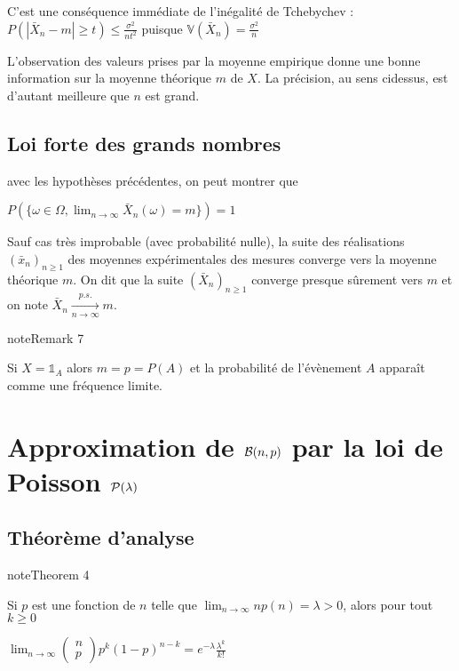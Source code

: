 \documentclass[letterpaper,10pt,english]{jupyterBook}
\begin{document}
\sphinxAtStartPar
C’est une conséquence immédiate de l’inégalité de Tchebychev : \(P(|\bar{X}_n-m|\geq t)\leq\frac{\sigma^2}{nt^2}\) puisque \(\mathbb{V}(\bar{X}_n)=\frac{\sigma^2}{n}\)

\sphinxAtStartPar
L’observation des valeurs prises par la moyenne empirique donne une bonne information sur la moyenne théorique \(m\) de \(X\). La précision, au sens ci\sphinxhyphen{}dessus, est d’autant meilleure que \(n\) est grand.


\subsection{Loi forte des grands nombres}
\label{\detokenize{elemstats:loi-forte-des-grands-nombres}}
\sphinxAtStartPar
avec les hypothèses précédentes, on peut montrer que

\sphinxAtStartPar
\(P(\{\omega\in\Omega, \displaystyle\lim_{n\rightarrow\infty} \bar{X}_n(\omega)=m\})=1\)

\sphinxAtStartPar
Sauf cas très improbable (avec probabilité nulle), la suite des réalisations \((\bar{x}_n)_{n\geq 1}\) des moyennes expérimentales des mesures converge vers la moyenne théorique \(m\). On dit que la suite \((\bar{X}_n)_{n\geq 1}\) converge presque sûrement vers \(m\) et on note \(\bar{X}_n\xrightarrow[n\rightarrow\infty]{p.s.} m\).
\label{elemstats:remark-7}
\begin{sphinxadmonition}{note}{Remark 7}



\sphinxAtStartPar
Si \(X=\mathbb{1}_A\) alors \(m=p=P(A)\) et la probabilité de l’évènement \(A\) apparaît comme une fréquence limite.
\end{sphinxadmonition}


\section{Approximation de \protect\(\mathcal{B}(n,p)\protect\) par la loi de Poisson \protect\(\mathcal P(\lambda)\protect\)}
\label{\detokenize{elemstats:approximation-de-mathcal-b-n-p-par-la-loi-de-poisson-mathcal-p-lambda}}

\subsection{Théorème d’analyse}
\label{\detokenize{elemstats:theoreme-d-analyse}}\label{elemstats:theorem-8}
\begin{sphinxadmonition}{note}{Theorem 4}



\sphinxAtStartPar
Si \(p\) est une fonction de \(n\) telle que \(\displaystyle\lim_{n\rightarrow\infty}np(n)=\lambda>0\), alors pour tout \(k\geq 0\)

\sphinxAtStartPar
\(\displaystyle\lim_{n\rightarrow\infty}\begin{pmatrix}n\\p\end{pmatrix} p^k(1-p)^{n-k} = e^{-\lambda}\frac{\lambda^k}{k!}\)
\end{sphinxadmonition}
\end{document}
